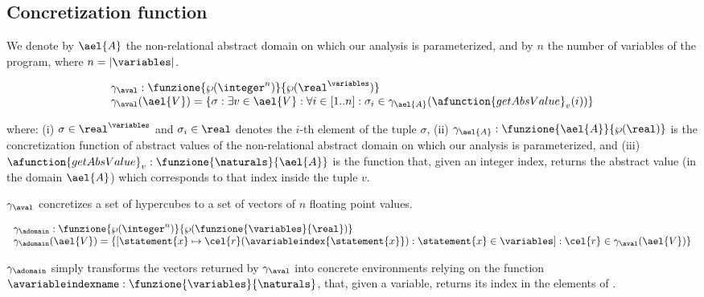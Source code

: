 \subsection{Concretization function}
We denote by $\ael{A}$ the non-relational abstract domain on which our analysis is parameterized, and by $n$ the number of variables of the program, where $n = | \variables |$.

$$
\begin{array}{l}
\gamma_{\aval} : \funzione{\wp(\integer^n)}{\wp(\real^\variables)}\\
\gamma_{\aval}(\ael{V}) = \{\sigma : \exists v \in \ael{V} : \forall i \in [1..n] : \sigma_i \in \gamma_\ael{A}(\afunction{getAbsValue}_v(i)) \}
\end{array}
$$

where: (i) $\sigma \in \real^\variables$ and $\sigma_i \in \real$ denotes the $i$-th element of the tuple $\sigma$, (ii) $\gamma_\ael{A} : \funzione{\ael{A}}{\wp(\real)}$ is the concretization function of abstract values of the non-relational abstract domain on which our analysis is parameterized, and (iii)  $\afunction{getAbsValue}_v : \funzione{\naturals}{\ael{A}}$ is the function that, given an integer index, returns the abstract value (in the domain $\ael{A}$) which corresponds to that index inside the tuple $v$.

$\gamma_{\aval}$ concretizes a set of hypercubes to a set of vectors of $n$ floating point values. 

$$
\begin{array}{l}
\gamma_{\adomain} : \funzione{\wp(\integer^n)}{\wp(\funzione{\variables}{\real})}\\
\gamma_{\adomain}(\ael{V}) = \{[\statement{x} \mapsto \cel{r}(\avariableindex{\statement{x}}) : \statement{x} \in \variables] : \cel{r} \in \gamma_{\aval}(\ael{V})\}
\end{array}
$$

$\gamma_{\adomain}$ simply transforms the vectors returned by $\gamma_{\aval}$ into concrete environments relying on the function $\avariableindexname : \funzione{\variables}{\naturals}$, that, given a variable, returns its index in the elements of \adomain.


